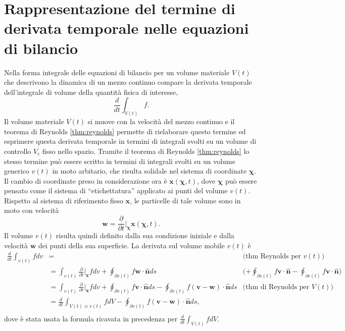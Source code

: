 
\section{Rappresentazione del termine di derivata temporale nelle equazioni di bilancio}
Nella forma integrale delle equazioni di bilancio per un volume materiale $V(t)$ che descrivono la dinamica di un mezzo continuo compare la derivata temporale dell'integrale di volume della quantità fisica di interesse,
\begin{equation}
 \dfrac{d}{d t} \int_{V(t)} f .
\end{equation}
Il volume materiale $V(t)$ si muove con la velocità del mezzo continuo e il teorema di Reynolds \ref{thm:reynolds} permette di rielaborare questo termine ed esprimere questa derivata temporale in termini di integrali svolti su un volume di controllo $V_c$ fisso nello spazio.
%
Tramite il teorema di Reynolds \ref{thm:reynolds} lo stesso termine può essere scritto in termini di integrali svolti su un volume generico $v(t)$ in moto arbitario, che risulta solidale nel sistema di coordinate $\bm{\chi}$. Il cambio di coordinate preso in considerazione ora è $\bm{x}(\bm{\chi},t)$, dove $\bm{\chi}$ può essere pensato come il sistema di ``etichettatura'' applicato ai punti del volume $v(t)$. Rispetto al sistema di riferimento fisso $\bm{x}$, le particelle di tale
 volume sono in moto con velocità 
\begin{equation}
  \bm{w} = \dfrac{\partial}{\partial t}\bigg|_{\bm{\chi}} \bm{x}(\bm{\chi},t) .
\end{equation}
Il volume $v(t)$ risulta quindi definito dalla sua condizione iniziale e dalla velocità $\bm{w}$ dei punti della sua superficie.
\noindent
La derivata sul volume mobile $v(t)$ è
\begin{equation}
\begin{aligned}
  \frac{d}{dt} \int_{v(t)} f dv  & = & \text{(thm Reynolds per $v(t)$)} \\
                                 & = \int_{v(t)} \frac{\partial }{\partial t}\bigg|_{\bm{x}} f dv + \oint_{\partial v(t)} f\bm{w} \cdot \bm{\hat{n}} ds &
                                        \text{($+\oint_{\partial v(t)} f\bm{v} \cdot \bm{\hat{n}} -\oint_{\partial v(t)} f\bm{v} \cdot \bm{\hat{n}} $)} \\
                                 & = \int_{v(t)} \frac{\partial }{\partial t}\bigg|_{\bm{x}} f dv + \oint_{\partial v(t)} f\bm{v} \cdot \bm{\hat{n}} ds 
                                      - \oint_{\partial v(t)} f(\bm{v}-\bm{w}) \cdot \bm{\hat{n}} ds  & \text{(thm di Reynolds per $V(t)$)}\\
                                 & = \frac{d}{dt} \int_{V(t)\equiv v(t)} f dV - \oint_{\partial v(t)} f(\bm{v}-\bm{w}) \cdot \bm{\hat{n}} ds , \\
\end{aligned}
\end{equation}
dove è stata usata la formula ricavata in precedenza per $\frac{d}{dt} \int_{V(t)} f dV$.

